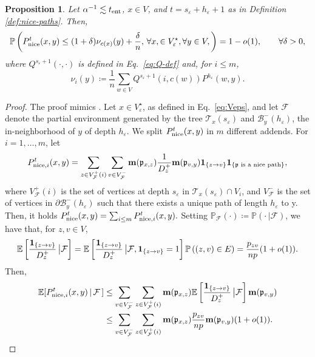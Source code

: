 \documentclass[11pt,oneside]{amsart}
\numberwithin{equation}{section}  %
\theoremstyle{plain}
\newtheorem{proposition}[theorem]{Proposition}
\newcommand{\eps}{\varepsilon}
\newcommand{\E}{\mathbb{E}}
\newcommand{\p}{\mathbb{P}}
\newcommand{\one}{\textup{\textbf{1}}}
\newcommand{\tent}{t_{\textup{ent}}}
\newcommand{\semi}{{Q}}
\newcommand{\veps}{V^{\star}_\eps}
\newcommand{\mass}{\textup{\textbf{m}}}
\newcommand{\pat}{\mathfrak{p}}
\newcommand{\h}{{h_\eps}}
\newcommand{\s}{{s_\eps}}
\begin{document}
	\begin{proposition} \label{prop:drop-positive-part} 
		Let $\alpha^{-1}\lesssim \tent$, $x\in V$, and $t = \s + \h + 1$ as in Definition \ref{def:nice-paths}.
		Then,
				\begin{equation}
			\p\left(
			P_{\rm nice}^t(x,y)
			\le (1+\delta)\nu_{c(x)}(y)+\frac{\delta}{n}, \, \forall x, \in \veps, \forall y \in V,
			\right)=1-o(1), \qquad \forall \delta>0,
		\end{equation}
		where $\semi^{\s+1}(\cdot,\cdot)$ is defined in Eq.~\eqref{eq:Q-def} and, for $i \le m$,
		\begin{equation} \label{eq:nu-i}
			\nu_i(y) \coloneqq \frac1n \sum_{w \in V}{\semi^{\s+1}(i,c(w)) }P^{\h}(w,y).
		\end{equation} 
	\end{proposition}
	\begin{proof}
    The proof mimics \cite[Prop. 3]{BP}.
		Let $x \in \veps$, as defined in Eq.\ \eqref{eq:Veps}, and let $\mathcal{F}$ denote the partial environment generated by the tree $\mathcal{T}_x(\s)$ and $\mathcal{B}^-_y(\h)$, the in-neighborhood of $y$ of depth $\h$. We split $P_{\rm nice}^t(x,y)$ in $m$ different addends. 
		For $i=1,\dots, m$, let
%
	$$P_{{\rm nice},i}^t(x,y) = 
	\sum_{z \in V^+_\mathcal{F}(i)} \sum_{v \in V^-_\mathcal{F}} 
	\mass(\pat_{x,z}) \frac{1}{D^{+}_z}\mass(\pat_{v,y})
	\one_{\{z \to v\}}\one_{\{\pat \textup{ is a nice path}\}},$$
% 
	where $V^+_\mathcal{F}(i)$ is the set of vertices 
    at depth $\s$ in $\mathcal{T}_x(\s)\cap V_i$, and $V^-_{\mathcal{F}}$ is the set of vertices in $\partial \mathcal{B}^-_y(\h)$ such that there exists a unique path of length $\h$ to y.
		Then, it holds $P_{\rm nice}^t(x,y)=\sum_{i \le m}P_{{\rm nice},i}^t(x,y).$
		Setting $\p_{\mathcal{F}}(\cdot)\coloneqq\p(\cdot\,|\mathcal{F})$, we have that, for $z,v \in V$, 
			\begin{equation}
                \E\left[\frac{\one_{\{z \to v\}}}{D^{+}_z}\,\big|\mathcal{F}\right]=\E\left[\frac{\one_{\{z \to v\}}}{D^{+}_z}\,\big|\mathcal{F},\one_{\{z \to v\}}=1\right]\p\left((z,v)\in E\right)= \frac{p_{zv}}{np}(1+o(1)).
            \end{equation}
		Then,
		\begin{align*}
			\E[P_{{\rm nice},i}^t(x,y)\,|\, \mathcal{F}\,]
			&\le  \sum_{v \in V^-_\mathcal{F}}\sum_{z \in V^+_\mathcal{F}(i)} \mass(\pat_{x,z}) 
			\E\left[\frac{\one_{\{z \to v\}}}{D^{+}_z}\,\big|\mathcal{F}\right]\mass(\pat_{v,y})\\
			&\le  \sum_{v \in V^-_\mathcal{F}}\sum_{z \in V^+_\mathcal{F}(i)}\mass(\pat_{x,z}) \frac{p_{zv}}{np}\mass(\pat_{v,y})(1+o(1)).

\end{align*}
\end{proof}
\end{document}
